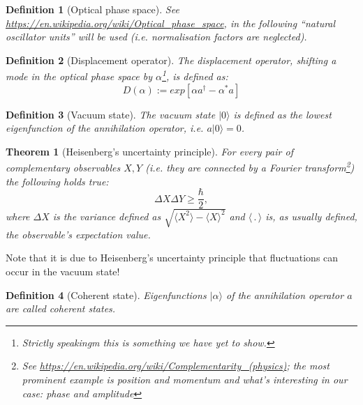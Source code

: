 \documentclass[11pt]{report}
\newtheorem{definition}{Definition}[chapter]
\newtheorem{theorem}{Theorem}[section]
\begin{document}
\begin{definition}[Optical phase space]
	See \url{https://en.wikipedia.org/wiki/Optical_phase_space}, in the following ``natural oscillator units'' will be used (i.e. normalisation factors are neglected).
\end{definition}

\begin{definition}[Displacement operator]
	The displacement operator, shifting a mode in the optical phase space by $\alpha$\footnote{Strictly speakingm this is something we have yet to show.}, is defined as:
	$$D(\alpha) := exp[\alpha a^\dagger - \alpha^*a]$$
	
\end{definition}

\begin{definition}[Vacuum state]
	The vacuum state $|0\rangle$ is defined as the lowest eigenfunction of the annihilation operator, i.e. $a|0\rangle = 0$.
\end{definition}

\begin{theorem}[Heisenberg's uncertainty principle]
	For every pair of complementary observables $X,Y$ (i.e. they are connected by a Fourier transform\footnote{See \url{https://en.wikipedia.org/wiki/Complementarity_(physics)}; the most prominent example is position and momentum and what's interesting in our case: phase and amplitude}) the following holds true: $$\Delta X\Delta Y\geq \frac{\hbar}{2},$$ where $\Delta X$ is the variance defined as $\sqrt{\langle X^2\rangle - \langle X\rangle^2}$ and $\langle \,.\,\rangle$ is, as usually defined, the observable's expectation value.
\end{theorem}

Note that it is due to Heisenberg's uncertainty principle that fluctuations can occur in the vacuum state!

\begin{definition}[Coherent state]
	Eigenfunctions $|\alpha\rangle$ of the annihilation operator $a$ are called coherent states.
\end{definition}
\end{document}
